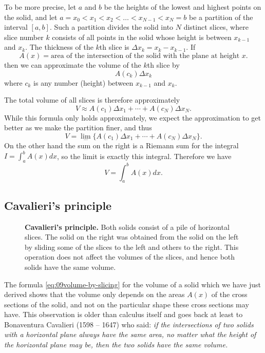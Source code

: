 To be more precise, let $a$ and $b$ be the heights of the lowest and highest
points on the solid, and let $a=x_0<x_1<x_2<\ldots<x_{N-1}<x_N=b$ be a partition
of the interval $[a, b]$.  Such a partition divides the solid into $N$ distinct
slices, where slice number $k$ consists of all points in the solid whose height
is between $x_{k-1}$ and $x_k$.  The thickness of the $k$th slice is $\Delta x_k
= x_k-x_{k-1}$.  If
\[
A(x) = \text{area of the intersection of the solid with the plane at height
  $x$.}
\]
then we can approximate the volume of the $k$th slice by
\[
A(c_k) \Delta x_k
\]
where $c_k$ is any number (height) between $x_{k-1}$ and $x_k$.

The total volume of all slices is therefore approximately
\[
V\approx A(c_1)\Delta x_1 + \cdots + A(c_N)\Delta x_N.
\]
While this formula only holds approximately, we expect the approximation to get
better as we make the partition finer, and thus
\begin{equation}
  \label{eq:09vol-of-all-slices}
  V = \lim_{\cdots} \bigl\{A(c_1)\Delta x_1 + \cdots + A(c_N)\Delta x_N\bigr\}.
\end{equation}
On the other hand the sum on the right is a Riemann sum for the integral $I=
\int_a^b A(x) dx$, so the limit is exactly this integral.  Therefore we have
\begin{equation}\label{eq:09volume-by-slicing}
  V = \int_a^b A(x)dx.
\end{equation}



\subsection{Cavalieri's principle}
\begin{figure}[b]
  \centerline{}

  \caption{\textbf{Cavalieri's principle. }  Both solids consist of a pile of
    horizontal slices. The solid on the right was obtained from the solid on the
    left by sliding some of the slices to the left and others to the right.
    This operation does not affect the volumes of the slices, and hence both
    solids have the same volume.}
\end{figure}
The formula \eqref{eq:09volume-by-slicing} for the volume of a solid which we
have just derived shows that the volume only depends on the areas $A(x)$ of the
cross sections of the solid, and not on the particular shape these cross
sections may have.  This observation is older than calculus itself and goes back
at least to Bonaventura Cavalieri (1598 -- 1647) who said: {\itshape if the
  intersections of two solids with a horizontal plane always have the same area,
  no matter what the height of the horizontal plane may be, then the two solids
  have the same volume.  }

